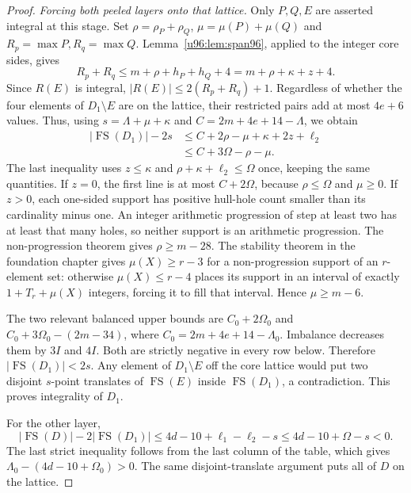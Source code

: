 \documentclass[11pt,a4paper]{article}
\theoremstyle{remark}
\newcommand{\FS}{\operatorname{FS}}
\begin{document}
\begin{proof}
\emph{Forcing both peeled layers onto that lattice.}
Only $P,Q,E$ are asserted integral at this stage. Set
$\rho=\rho_P+\rho_Q$, $\mu=\mu(P)+\mu(Q)$ and
$R_p=\max P,R_q=\max Q$. Lemma~\ref{u96:lem:span96}, applied to the
integer core sides, gives
\[
 R_p+R_q\leq m+\rho+h_P+h_Q+4=m+\rho+\kappa+z+4.
\]
Since $R(E)$ is integral, $|R(E)|\leq2(R_p+R_q)+1$.
Regardless of whether the four elements of $D_1\setminus E$ are on
the lattice, their restricted pairs add at most $4e+6$ values. Thus,
using $s=\Lambda+\mu+\kappa$ and
$C=2m+4e+14-\Lambda$, we obtain
\begin{align*}
 |\FS(D_1)|-2s
 &\leq C+2\rho-\mu+\kappa+2z+\ell_2\\
 &\leq C+3\Omega-\rho-\mu.
\end{align*}
The last inequality uses $z\leq\kappa$ and
$\rho+\kappa+\ell_2\leq\Omega$ once, keeping the same quantities.
If $z=0$, the first line is at most $C+2\Omega$, because
$\rho\leq\Omega$ and $\mu\geq0$.
If $z>0$, each one-sided support has positive hull-hole count smaller
than its cardinality minus one. An integer arithmetic progression of
step at least two has at least that many holes, so neither support is
an arithmetic progression. The non-progression theorem gives
$\rho\geq m-28$. The stability theorem in the foundation chapter gives
$\mu(X)\geq r-3$ for a non-progression support of an $r$-element set:
otherwise $\mu(X)\leq r-4$ places its support in an interval of
exactly $1+T_r+\mu(X)$ integers, forcing it to fill that interval.
Hence $\mu\geq m-6$.

The two relevant balanced upper bounds are
$C_0+2\Omega_0$ and $C_0+3\Omega_0-(2m-34)$, where
$C_0=2m+4e+14-\Lambda_0$. Imbalance decreases them by $3I$ and $4I$.
Both are strictly negative in every row below. Therefore
$|\FS(D_1)|<2s$. Any element of $D_1\setminus E$ off the core lattice
would put two disjoint $s$-point translates of $\FS(E)$ inside
$\FS(D_1)$, a contradiction. This proves integrality of $D_1$.

For the other layer,
\[
 |\FS(D)|-2|\FS(D_1)|\leq4d-10+\ell_1-\ell_2-s
 \leq4d-10+\Omega-s<0.
\]
The last strict inequality follows from the last column of the table,
which gives $\Lambda_0-(4d-10+\Omega_0)>0$.
The same disjoint-translate argument puts all of $D$ on the lattice.


\end{proof}
\end{document}
